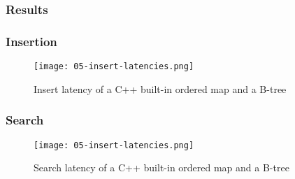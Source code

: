 \subsubsection{Results}

\subsubsection*{Insertion}

\begin{figure}[H]
	\begin{center}
		\texttt{[image: 05-insert-latencies.png]}
		\caption{Insert latency of a C++ built-in ordered map and a B-tree}
		\label{fig:05-insert-latency}
	\end{center}
\end{figure}

\subsubsection*{Search}

\begin{figure}[H]
	\begin{center}
		\texttt{[image: 05-insert-latencies.png]}
		\caption{Search latency of a C++ built-in ordered map and a B-tree}
		\label{fig:05-search-latency}
	\end{center}
\end{figure}
